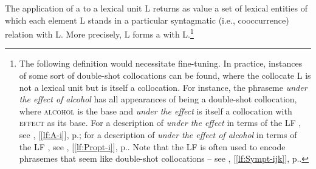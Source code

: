 The application of a  to a lexical unit L returns as value a set of lexical entities of which each element L stands in a particular syntagmatic (i.e., cooccurrence) relation with L. More precisely, L forms a  with L.\footnote{\label{fn:NatureCollocates}The following definition would necessitate fine-tuning. In practice, instances of some sort of double-shot collocations can be found, where the collocate L is not a lexical unit but is itself a collocation. For instance, the phraseme \textit{under the effect of alcohol} has all appearances of being a double-shot collocation, where \textsc{alcohol} is the base and \textit{under the effect} is itself a collocation with \textsc{effect} as its base. For a description of \textit{under the effect} in terms of the LF , see , [\ref{lf:A-i}], p.\thinspace\pageref{txt:A2UnderTheEffect}; for a description of \textit{under the effect of alcohol} in terms of the LF , see , [\ref{lf:Propt-i}], p.\thinspace\pageref{txt:Propt1UnderTheEffectOfAlcohol}. Note that the LF  is often used to encode phrasemes that seem like double-shot collocations -- see , [\ref{lf:Sympt-ijk}], p.\thinspace\pageref{lf:Sympt-ijk}.}

